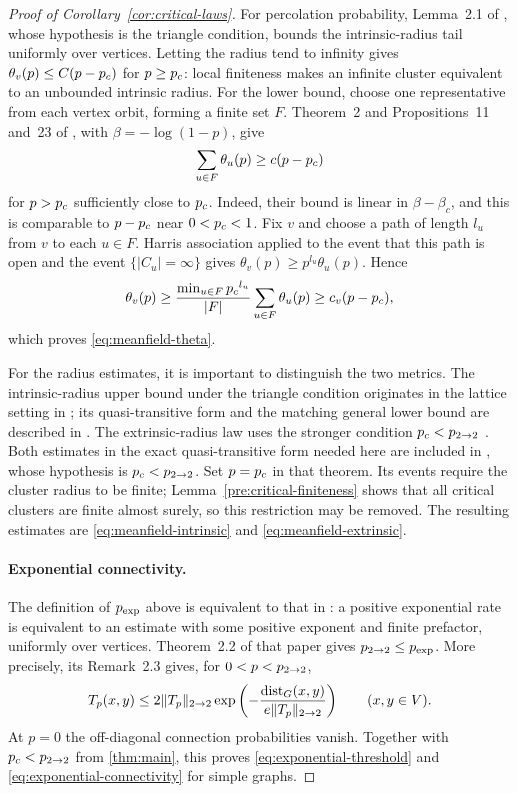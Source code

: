 \begin{proof}[Proof of Corollary~\ref{cor:critical-laws}]
For percolation probability, Lemma~2.1 of
\cite{Hutchcroft2022FiniteClusters}, whose hypothesis is
the triangle condition, bounds the intrinsic-radius tail uniformly
over vertices. Letting the radius tend to infinity gives
$\theta_v(p)\le C(p-{p_c})$ for $p\ge{p_c}$: local finiteness makes an
infinite cluster equivalent to an unbounded intrinsic radius.
For the lower bound, choose one representative from each vertex
orbit, forming a finite set $F$. Theorem~2 and Propositions~11
and~23 of \cite{AntunovicVeselic2008}, with
$\beta=-\log(1-p)$, give
\[
 \sum_{u\in F}\theta_u(p)\ge c(p-{p_c})
\]
for $p>{p_c}$ sufficiently close to ${p_c}$. Indeed, their bound is
linear in $\beta-\beta_c$, and this is comparable to $p-{p_c}$ near
$0<{p_c}<1$. Fix $v$ and choose a path of length $l_u$ from $v$ to
each $u\in F$. Harris association applied to the event that this
path is open and the event $\{|C_u|=\infty\}$ gives
$\theta_v(p)\ge p^{l_u}\theta_u(p)$. Hence
\[
 \theta_v(p)\ge
 \frac{\min_{u\in F}{p_c}^{l_u}}{|F|}
 \sum_{u\in F}\theta_u(p)
 \ge c_v(p-{p_c}),
\]
which proves \eqref{eq:meanfield-theta}.

For the radius estimates, it is important to distinguish the two
metrics. The intrinsic-radius upper bound under the triangle condition
originates in the lattice setting in
\cite[Theorem~1.2(ii)]{KozmaNachmias2009}; its
quasi-transitive form and the matching general lower bound are
described in \cite[Section~3]{Hutchcroft2020L2}. The extrinsic-radius
law uses the stronger condition ${p_c}<{p_{2\to2}}$
\cite[Theorem~3.1]{Hutchcroft2020L2}. Both estimates in the exact
quasi-transitive form needed here are included in
\cite[Theorem~1.2]{Hutchcroft2022FiniteClusters}, whose hypothesis is
${p_c}<{p_{2\to2}}$. Set $p={p_c}$ in that theorem. Its events require the
cluster radius to be finite; Lemma~\ref{pre:critical-finiteness} shows that
all critical clusters are finite almost surely, so this restriction
may be removed. The resulting estimates are
\eqref{eq:meanfield-intrinsic} and \eqref{eq:meanfield-extrinsic}.

\paragraph{Exponential connectivity.}
The definition of ${p_{\exp}}$ above is equivalent to that in
\cite[Section~2]{Hutchcroft2020L2}: a positive exponential rate is
equivalent to an estimate with some positive exponent and finite
prefactor, uniformly over vertices. Theorem~2.2 of that paper gives
${p_{2\to2}}\le{p_{\exp}}$. More precisely, its Remark~2.3 gives, for
$0<p<{p_{2\to2}}$,
\[
 T_p(x,y)\le
 2\lVert T_p\rVert_{2\to2}
 \exp\left(-\frac{\operatorname{dist}_G(x,y)}
                 {e\lVert T_p\rVert_{2\to2}}\right)
 \qquad(x,y\in V).
\]
At $p=0$ the off-diagonal connection probabilities vanish. Together
with ${p_c}<{p_{2\to2}}$ from \cref{thm:main}, this proves
\eqref{eq:exponential-threshold} and
\eqref{eq:exponential-connectivity} for simple graphs.


\end{proof}
